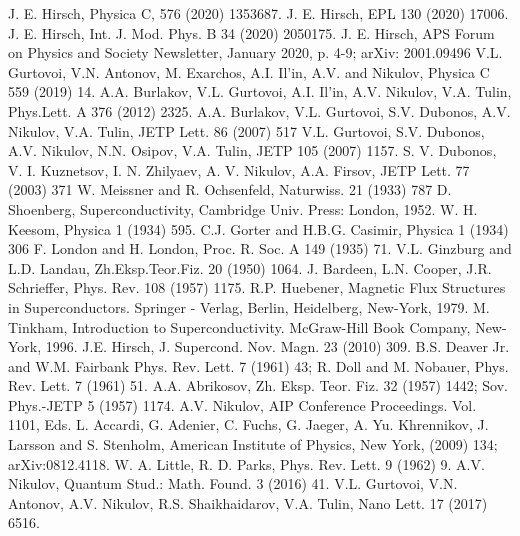 \documentclass[twocolumn,secnumarabic,amssymb, nobibnotes, aps, prd]{revtex4}
\begin{document}
\begin{thebibliography}{99}
  J. E. Hirsch, Physica C, 576 (2020) 1353687.
  J. E. Hirsch, EPL 130 (2020) 17006.
 J. E. Hirsch, Int. J. Mod. Phys. B 34 (2020) 2050175.
 J. E. Hirsch, APS Forum on Physics and Society Newsletter, January 2020, p. 4-9; arXiv: 2001.09496
 V.L. Gurtovoi, V.N. Antonov, M. Exarchos, A.I. Il'in, A.V. and Nikulov, Physica C 559 (2019) 14.
 A.A. Burlakov, V.L. Gurtovoi, A.I. Il'in, A.V. Nikulov, V.A. Tulin, Phys.Lett. A 376 (2012) 2325.
 A.A. Burlakov, V.L. Gurtovoi, S.V. Dubonos, A.V. Nikulov, V.A. Tulin,  JETP Lett. 86 (2007) 517
 V.L. Gurtovoi, S.V. Dubonos, A.V. Nikulov, N.N. Osipov, V.A. Tulin,  JETP 105 (2007) 1157.
 S. V. Dubonos, V. I. Kuznetsov, I. N. Zhilyaev, A. V. Nikulov, A.A. Firsov, JETP Lett. 77 (2003) 371
 W. Meissner and R. Ochsenfeld, Naturwiss. 21 (1933) 787
 D. Shoenberg, Superconductivity, Cambridge Univ. Press: London, 1952.
 W. H. Keesom, Physica 1 (1934) 595.
 C.J. Gorter and H.B.G. Casimir, Physica 1 (1934) 306
 F. London and H. London, Proc. R. Soc. A 149 (1935) 71. 
 V.L. Ginzburg and L.D. Landau, Zh.Eksp.Teor.Fiz. 20 (1950) 1064.
 J. Bardeen, L.N. Cooper, J.R. Schrieffer, Phys. Rev. 108 (1957) 1175.
 R.P. Huebener, Magnetic Flux Structures in Superconductors. Springer - Verlag, Berlin, Heidelberg, New-York, 1979.
 M. Tinkham, Introduction to Superconductivity. McGraw-Hill Book Company, New-York, 1996.
 J.E. Hirsch, J. Supercond. Nov. Magn. 23 (2010) 309.
 B.S. Deaver Jr. and W.M. Fairbank Phys. Rev. Lett. 7 (1961) 43; R. Doll and M. Nobauer, Phys. Rev. Lett. 7 (1961) 51.
 A.A. Abrikosov, Zh. Eksp. Teor. Fiz. 32 (1957) 1442; Sov. Phys.-JETP 5 (1957) 1174.
 A.V. Nikulov, AIP Conference Proceedings. Vol. 1101, Eds. L. Accardi, G. Adenier, C. Fuchs, G. Jaeger, A. Yu. Khrennikov, J. Larsson and S. Stenholm,  American Institute of Physics, New York, (2009) 134; arXiv:0812.4118.
 W. A. Little, R. D. Parks, Phys. Rev. Lett. 9 (1962) 9.
 A.V. Nikulov, Quantum Stud.: Math. Found. 3 (2016) 41.
 V.L. Gurtovoi, V.N. Antonov, A.V. Nikulov, R.S. Shaikhaidarov, V.A. Tulin, Nano Lett. 17 (2017) 6516.

\end{thebibliography}
\end{document}

